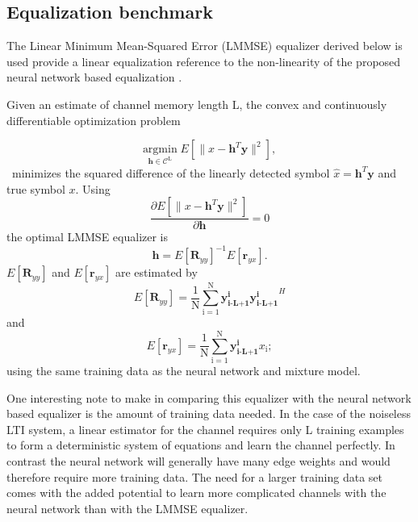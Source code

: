 \documentclass[12pt,a4paper]{report}
\begin{document}
\subsection{Equalization benchmark}
The Linear Minimum Mean-Squared Error (LMMSE) equalizer derived below is used provide a linear equalization reference to the non-linearity of the proposed neural network based equalization .
\par
Given an estimate of channel memory length L, the convex and continuously differentiable optimization problem 

\begin{equation*}\label{mmse}
\underset{\mathbf{\mathbf{h}} \in \textit{$\mathcal{C}^{\text{L}}$}}{\text{argmin}} \;
 E[\|x-\mathbf{h}^T\mathbf{y}\|^2],
\end{equation*}\
minimizes the squared difference of the linearly detected symbol $\hat{x}= \mathbf{h}^T\mathbf{y}$ and true symbol $x$.
Using
\begin{equation*}\label{mmse}
\frac{\partial  E[\|x-\mathbf{h}^T\mathbf{y}\|^2]}{\partial \mathbf{h} } = 0
\end{equation*}
the optimal LMMSE equalizer is \cite{proakis1988introduction}
\begin{equation*}\label{mmse}
\mathbf{h} = E[\mathbf{R}_{yy}]^{-1}E[\mathbf{r}_{yx}].
\end{equation*}
$E[\mathbf{R}_{yy}]$ and $E[\mathbf{r}_{yx}]$ are estimated by
\begin{equation*}\label{mmse}
 E[\mathbf{R}_{yy}]= \frac{1}{\mathrm{N}}\sum_{\mathrm{i=1}}^{\mathrm{N}}
\mathbf{y^{\text{i}}_{\text{i-L+1}}}\mathbf{y^{\text{i}}_{\text{i-L+1}}}^H
 \end{equation*}
 and
\begin{equation*}\label{mmse}
E[\mathbf{r}_{yx}]= \frac{1}{\mathrm{N}}\sum_{\mathrm{i=1}}^{\mathrm{N}}
\mathbf{y^{\text{i}}_{\text{i-L+1}}}x_{\text{i}}
;
 \end{equation*}
 using the same training data as the neural network and mixture model. 
 
\par
One interesting note to make in comparing this equalizer with the neural network based equalizer is the amount of training data needed. In the case of the noiseless LTI system, a linear estimator for the channel requires only L training examples to form a deterministic system of equations and learn the channel perfectly. In contrast the neural network will generally have many edge weights and would therefore require more training data. The need for a larger training data set comes with the added potential to learn more complicated channels with the neural network than with the LMMSE equalizer.
 
\end{document}
